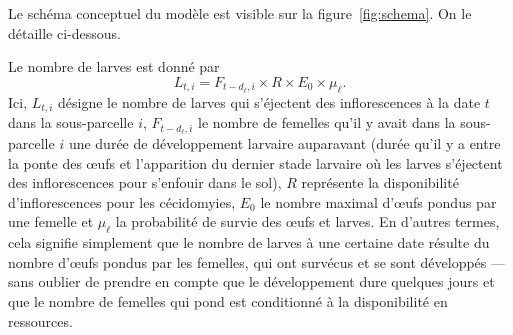 Le schéma conceptuel du modèle est visible sur la figure~\ref{fig:schema}. On le détaille ci-dessous.

Le nombre de larves est donné par 
\[
 L_{t, i} = F_{t - d_{\ell}, i} \times R \times E_0 \times \mu_{\ell}.
\]
Ici, $L_{t,i}$ désigne le nombre de larves qui s'éjectent des inflorescences à la date $t$ dans la sous-parcelle $i$, $F_{t - d_{\ell}, i}$ le nombre de femelles qu'il y avait dans la sous-parcelle $i$ une durée de développement larvaire auparavant (durée qu'il y a entre la ponte des œufs et l'apparition du dernier stade larvaire où les larves s'éjectent des inflorescences pour s'enfouir dans le sol), $R$ représente la disponibilité d'inflorescences pour les cécidomyies, $E_0$ le nombre maximal d'œufs pondus par une femelle et $\mu_{\ell}$ la probabilité de survie des œufs et larves.
En d'autres termes, cela signifie simplement que le nombre de larves à une certaine date résulte du nombre d'œufs pondus par les femelles, qui ont survécus et se sont développés --- sans oublier de prendre en compte que le développement dure quelques jours et que le nombre de femelles qui pond est conditionné à la disponibilité en ressources.



